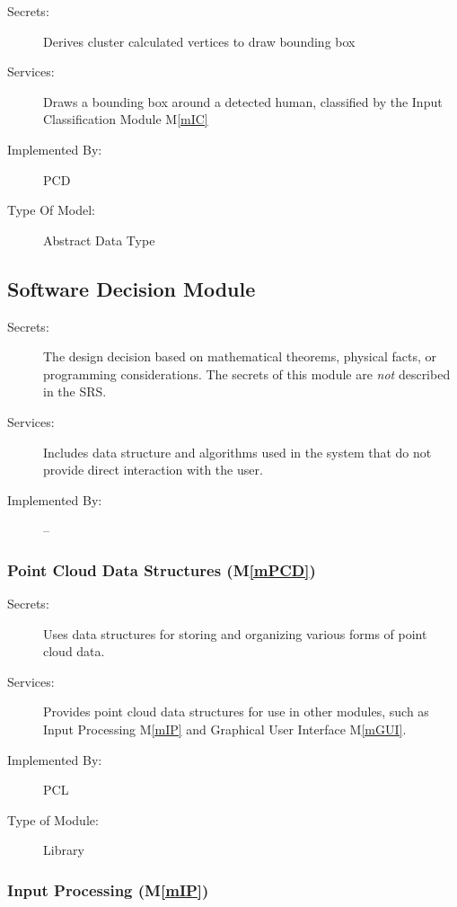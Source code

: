 \documentclass[12pt, titlepage]{article}
\newcommand{\mref}[1]{M\ref{#1}}
\begin{document}
\begin{description}
\item[Secrets:]Derives cluster calculated vertices to draw bounding box
\item[Services:]Draws a bounding box around a detected human, classified by the Input Classification Module \mref{mIC}
\item[Implemented By:]PCD
\item[Type Of Model:]Abstract Data Type
\end{description}

\subsection{Software Decision Module}

\begin{description}
\item[Secrets:] The design decision based on mathematical theorems, physical
  facts, or programming considerations. The secrets of this module are
  \emph{not} described in the SRS.
\item[Services:] Includes data structure and algorithms used in the system that
  do not provide direct interaction with the user. 
\item[Implemented By:] --
\end{description}

\subsubsection{Point Cloud Data Structures (\mref{mPCD})}

\begin{description}
\item[Secrets:] Uses data structures for storing and organizing various forms of point cloud data.
\item[Services:] Provides point cloud data structures for use in other modules, such as 
  Input Processing \mref{mIP} and Graphical User Interface \mref{mGUI}.
\item[Implemented By:] PCL
\item[Type of Module:] Library
\end{description}

\subsubsection{Input Processing (\mref{mIP})}
\end{document}
